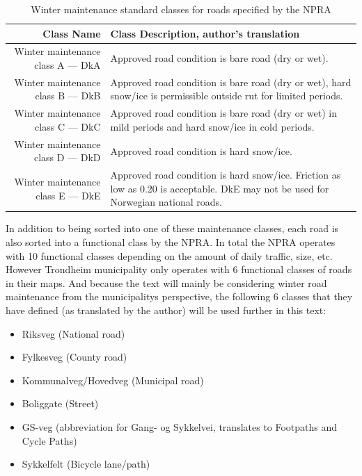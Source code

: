 {
\begin{table}[tbph]
\centering
\caption{Winter maintenance standard classes for roads specified by the NPRA}
\label{tab:wmscfrsbtn}
\begin{tabular}{rl}
\hline
\textbf{Class Name}                 &  \textbf{Class Description, author's translation}                                                                                    \\ \hline
Winter maintenance class A --- DkA  &  Approved road condition is bare road (dry or wet).                                                                                  \\
Winter maintenance class B --- DkB  &  Approved road condition is bare road (dry or wet), hard snow/ice is permissible outside rut for limited periods.                    \\
Winter maintenance class C --- DkC  &  Approved road condition is bare road (dry or wet) in mild periods and hard snow/ice in cold periods.                                \\
Winter maintenance class D --- DkD  &  Approved road condition is hard snow/ice.                                                                                           \\
Winter maintenance class E --- DkE  &  Approved road condition is hard snow/ice. Friction as low as 0.20 is acceptable. DkE may not be used for Norwegian national roads.  \\ \hline
\end{tabular}
\end{table}
}

In addition to being sorted into one of these maintenance classes, each road is also sorted into a functional class by the NPRA. In total the NPRA operates with 10 functional classes depending on the amount of daily traffic, size, etc. However Trondheim municipality only operates with 6 functional classes of roads in their maps. And because the text will mainly be considering winter road maintenance from the municipalitys perspective, the following 6 classes that they have defined (as translated by the author) will be used further in this text:

\begin{itemize}
    \item Riksveg (National road)
    \item Fylkesveg (County road)
    \item Kommunalveg/Hovedveg (Municipal road)
    \item Boliggate (Street)
    \item GS-veg (abbreviation for Gang- og Sykkelvei, translates to Footpaths and Cycle Paths) %
    \item Sykkelfelt (Bicycle lane/path)
\end{itemize}

